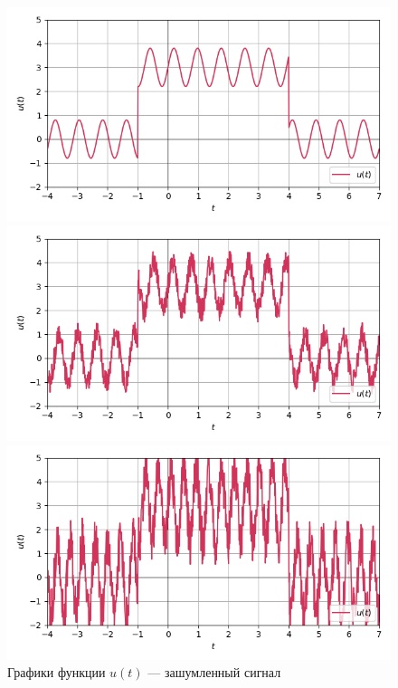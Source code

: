 \documentclass[a4paper]{article}
\begin{document}
\begin{figure}[H]
    \begin{minipage}{0.33\textwidth}
        \centering \includegraphics[width=\textwidth]{sources/band-stop filter/noisy (b=0, c=0.8, d=8).png}
        \caption{$b = 0, c = 0.8, d = 8$}
    \end{minipage}\hfill
    \begin{minipage}{0.33\textwidth}
        \centering \includegraphics[width=\textwidth]{sources/band-stop filter/noisy (b=1, c=1, d=10).png}
        \caption{$b = 1, c = 1, d = 10$}
    \end{minipage}\hfill
    \begin{minipage}{0.33\textwidth}
        \centering \includegraphics[width=\textwidth]{sources/band-stop filter/noisy (b=2, c=1.5, d=15).png}
        \caption{$b = 2, c = 1.5, d = 15$}
    \end{minipage}
    \caption*{Графики функции $u(t)$ --- зашумленный сигнал}
\end{figure}
\end{document}
